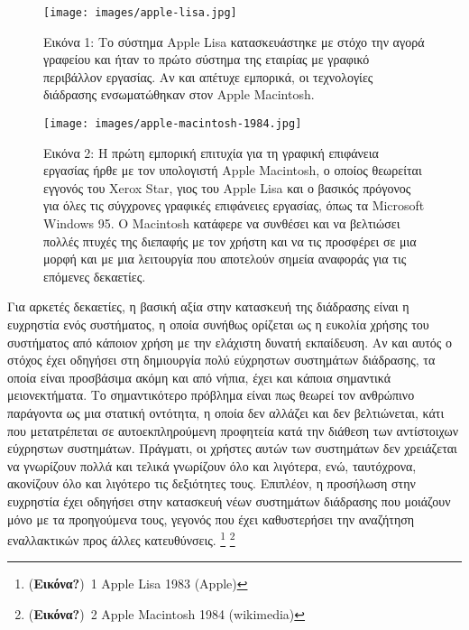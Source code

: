 \documentclass[
]{article}
\begin{document}
\leavevmode{}%
\begin{figure}
\hypertarget{fig:apple-lisa}{%
\centering
\texttt{[image: images/apple-lisa.jpg]}
\caption{Εικόνα 1: Το σύστημα Apple Lisa κατασκευάστηκε με στόχο την
αγορά γραφείου και ήταν το πρώτο σύστημα της εταιρίας με γραφικό
περιβάλλον εργασίας. Αν και απέτυχε εμπορικά, οι τεχνολογίες διάδρασης
ενσωματώθηκαν στον Apple Macintosh.}\label{fig:apple-lisa}
}
\end{figure}

\leavevmode{}%
\begin{figure}
\hypertarget{fig:apple-macintosh}{%
\centering
\texttt{[image: images/apple-macintosh-1984.jpg]}
\caption{Εικόνα 2: Η πρώτη εμπορική επιτυχία για τη γραφική επιφάνεια
εργασίας ήρθε με τον υπολογιστή Apple Macintosh, ο οποίος θεωρείται
εγγονός του Xerox Star, γιος του Apple Lisa και ο βασικός πρόγονος για
όλες τις σύγχρονες γραφικές επιφάνειες εργασίας, όπως τα Microsoft
Windows 95. O Macintosh κατάφερε να συνθέσει και να βελτιώσει πολλές
πτυχές της διεπαφής με τον χρήστη και να τις προσφέρει σε μια μορφή και
με μια λειτουργία που αποτελούν σημεία αναφοράς για τις επόμενες
δεκαετίες.}\label{fig:apple-macintosh}
}
\end{figure}

Για αρκετές δεκαετίες, η βασική αξία στην κατασκευή της διάδρασης είναι
η ευχρηστία ενός συστήματος, η οποία συνήθως ορίζεται ως η ευκολία
χρήσης του συστήματος από κάποιον χρήση με την ελάχιστη δυνατή
εκπαίδευση. Αν και αυτός ο στόχος έχει οδηγήσει στη δημιουργία πολύ
εύχρηστων συστημάτων διάδρασης, τα οποία είναι προσβάσιμα ακόμη και από
νήπια, έχει και κάποια σημαντικά μειονεκτήματα. Το σημαντικότερο
πρόβλημα είναι πως θεωρεί τον ανθρώπινο παράγοντα ως μια στατική
οντότητα, η οποία δεν αλλάζει και δεν βελτιώνεται, κάτι που μετατρέπεται
σε αυτοεκπληρούμενη προφητεία κατά την διάθεση των αντίστοιχων εύχρηστων
συστημάτων. Πράγματι, οι χρήστες αυτών των συστημάτων δεν χρειάζεται να
γνωρίζουν πολλά και τελικά γνωρίζουν όλο και λιγότερα, ενώ, ταυτόχρονα,
ακονίζουν όλο και λιγότερο τις δεξιότητες τους. Επιπλέον, η προσήλωση
στην ευχρηστία έχει οδηγήσει στην κατασκευή νέων συστημάτων διάδρασης
που μοιάζουν μόνο με τα προηγούμενα τους, γεγονός που έχει καθυστερήσει
την αναζήτηση εναλλακτικών προς άλλες κατευθύνσεις. \footnote{(\textbf{Εικόνα?})~1
  Apple Lisa 1983 (Apple)} \footnote{(\textbf{Εικόνα?})~2 Apple
  Macintosh 1984 (wikimedia)}
\end{document}
